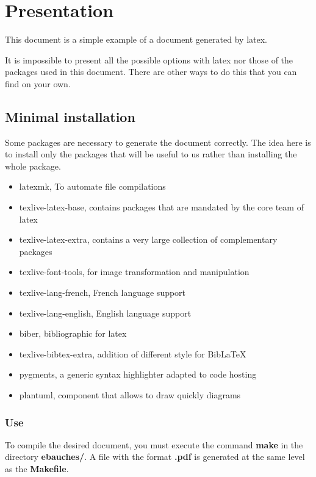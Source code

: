 \section{Presentation}
This document is a simple example of a document generated by \gls{latex}. \newline

It is impossible to present all the possible options with \gls{latex} nor those of the packages used
in this document.
There are other ways to do this that you can find on your own.

\subsection{Minimal installation}
Some packages are necessary to generate the document correctly.
The idea here is to install only the packages that will be useful to us rather than installing the whole package.
\begin{itemize}
    \item latexmk, To automate file compilations
    \item texlive-latex-base, contains packages that are mandated by the core team of \gls{latex}
    \item texlive-latex-extra, contains a very large collection of complementary packages
    \item texlive-font-tools, for image transformation and manipulation
    \item texlive-lang-french, French language support
    \item texlive-lang-english, English language support
    \item biber, bibliographic for \gls{latex}
    \item texlive-bibtex-extra, addition of different style for BibLaTeX
    \item pygments, a generic syntax highlighter adapted to code hosting
    \item plantuml, component that allows to draw quickly diagrams
\end{itemize}

\subsubsection{Use} %
To compile the desired document, you must execute the command \textbf{make} in the directory \textbf{ebauches/}.
A file with the format \textbf{.pdf} is generated at the same level as the \textbf{Makefile}. \newline

